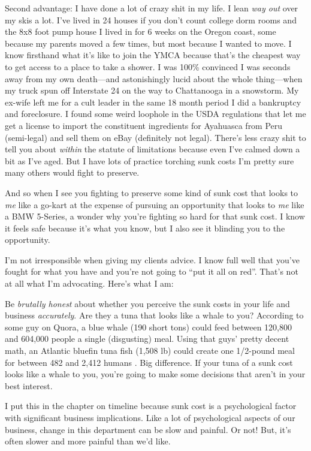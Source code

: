 Second advantage: I have done a lot of crazy shit in my life. I lean \emph{way out} over my skis a lot. I've lived in 24 houses if you don't count college dorm rooms and the 8x8 foot pump house I lived in for 6 weeks on the Oregon coast, some because my parents moved a few times, but most because I wanted to move. I know firsthand what it’s like to join the YMCA because that’s the cheapest way to get access to a place to take a shower.  I was 100\% convinced I was seconds away from my own death—and astonishingly lucid about the whole thing—when my truck spun off Interstate 24 on the way to Chattanooga in a snowstorm. My ex-wife left me for a cult leader in the same 18 month period I did a bankruptcy and foreclosure. I found some weird loophole in the USDA regulations that let me get a license to import the constituent ingredients for Ayahuasca from Peru (semi-legal) and sell them on eBay (definitely not legal). There’s less crazy shit to tell you about \emph{within} the statute of limitations because even I’ve calmed down a bit as I’ve aged. But I have lots of practice torching sunk costs I’m pretty sure many others would fight to preserve.

And so when I see you fighting to preserve some kind of sunk cost that looks to \emph{me} like a go-kart at the expense of pursuing an opportunity that looks to \emph{me} like a BMW 5-Series, a wonder why you’re fighting so hard for that sunk cost. I know it feels safe because it’s what you know, but I also see it blinding you to the opportunity.

I’m not irresponsible when giving my clients advice. I know full well that you’ve fought for what you have and you’re not going to “put it all on red”. That’s not at all what I’m advocating. Here’s what I am:

Be \emph{brutally honest} about whether you perceive the sunk costs in your life and business \emph{accurately}. Are they a tuna that looks like a whale to you? According to some guy on Quora, a blue whale (190 short tons) could feed between 120,800 and 604,000 people a single (disgusting) meal. Using that guys' pretty decent math, an Atlantic bluefin tuna fish (1,508 lb) could create one 1/2-pound meal for between 482 and 2,412 humans . Big difference. If your tuna of a sunk cost looks like a whale to you, you’re going to make some decisions that aren’t in your best interest.

I put this in the chapter on timeline because sunk cost is a psychological factor with significant business implications. Like a lot of psychological aspects of our business, change in this department can be slow and painful. Or not! But, it’s often slower and more painful than we’d like.

